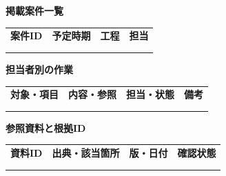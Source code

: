 \documentclass[11pt,a4paper]{article}
\begin{document}
\par{}\noindent\textbf{掲載案件一覧}\par\vspace{1mm}
{\fontsize{8.5}{13}\selectfont
\begin{tabularx}{\linewidth}{@{}XXXX@{}}
\textbf{案件ID} & \textbf{予定時期} & \textbf{工程} & \textbf{担当}\\[2mm]
\strut & \strut & \strut & \strut\\[5mm]
\strut & \strut & \strut & \strut\\[5mm]
\end{tabularx}
}\vspace{2mm}\par
{}
\par{}\noindent\textbf{担当者別の作業}\par\vspace{1mm}
{\fontsize{8.5}{13}\selectfont
\begin{tabularx}{\linewidth}{@{}XXXX@{}}
\textbf{対象・項目} & \textbf{内容・参照} & \textbf{担当・状態} & \textbf{備考}\\[2mm]
\strut & \strut & \strut & \strut\\[5mm]
\strut & \strut & \strut & \strut\\[5mm]
\end{tabularx}
}\vspace{2mm}\par
{}
\par{}\noindent\textbf{参照資料と根拠ID}\par\vspace{1mm}
{\fontsize{8.5}{13}\selectfont
\begin{tabularx}{\linewidth}{@{}XXXX@{}}
\textbf{資料ID} & \textbf{出典・該当箇所} & \textbf{版・日付} & \textbf{確認状態}\\[2mm]
\strut & \strut & \strut & \strut\\[5mm]
\strut & \strut & \strut & \strut\\[5mm]
\end{tabularx}
}\vspace{2mm}\par
\end{document}
